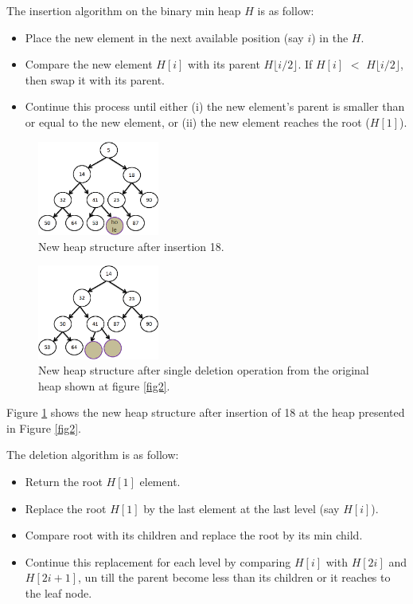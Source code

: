 \documentclass[10pt, conference, compsocconf]{IEEEtran}
\begin{document}
The insertion algorithm on the binary min heap $H$ is as follow:
\begin{itemize}
\item Place the new element in the next available position (say $i$) in the $H$.
\item Compare the new element $H[i]$ with its parent $H\lfloor i/2 \rfloor$. If $H[i]$ $<$ $H\lfloor i/2 \rfloor$, then swap it with its parent.
\item Continue this process until either (i) the new element’s parent is smaller than or
equal to the new element, or (ii) the new element reaches the root ($H[1]$).
\end{itemize}

\begin{figure}[h]
  \centering
  \includegraphics[width=4cm]{Figures/fig3.png}
      \caption{New heap structure after insertion 18.}
    \label{fig3}
\end{figure}

\begin{figure}[h]
  \centering
  \includegraphics[width=4cm]{Figures/fig4.png}
      \caption{New heap structure after single deletion operation from the original heap shown at figure \ref{fig2}.}
    \label{fig4}
\end{figure}

Figure \ref{fig3} shows the new heap structure after insertion of 18 at the heap presented in Figure \ref{fig2}.

The deletion algorithm is as follow:
\begin{itemize}
\item Return the root $H[1]$ element.
\item Replace the root $H[1]$ by the last element at the last level (say $H[i]$).
\item Compare root with its children and replace the root by its min child.
\item Continue this replacement for each level by comparing $H[i]$ with $H[2i]$ and $H[2i+1]$, un till the parent become less than its children or it reaches to the leaf node.
\end{itemize}
\end{document}
